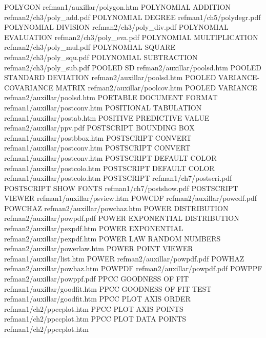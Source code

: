 POLYGON                                 refman1/auxillar/polygon.htm
POLYNOMIAL ADDITION                     refman2/ch3/poly_add.pdf
POLYNOMIAL DEGREE                       refman1/ch5/polydegr.pdf
POLYNOMIAL DIVISION                     refman2/ch3/poly_div.pdf
POLYNOMIAL EVALUATION                   refman2/ch3/poly_eva.pdf
POLYNOMIAL MULTIPLICATION               refman2/ch3/poly_mul.pdf
POLYNOMIAL SQUARE                       refman2/ch3/poly_squ.pdf
POLYNOMIAL SUBTRACTION                  refman2/ch3/poly_sub.pdf
POOLED SD                               refman2/auxillar/poolsd.htm
POOLED STANDARD DEVIATION               refman2/auxillar/poolsd.htm
POOLED VARIANCE-COVARIANCE MATRIX       refman2/auxillar/poolcov.htm
POOLED VARIANCE                         refman2/auxillar/poolsd.htm
PORTABLE DOCUMENT FORMAT                refman1/auxillar/postconv.htm
POSITIONAL TABULATION                   refman1/auxillar/postab.htm
POSITIVE PREDICTIVE VALUE               refman2/auxillar/ppv.pdf
POSTSCRIPT BOUNDING BOX                 refman1/auxillar/postbbox.htm
POSTSCRIPT CONVERT                      refman1/auxillar/postconv.htm
POSTSCRIPT CONVERT                      refman1/auxillar/postconv.htm
POSTSCRIPT DEFAULT COLOR                refman1/auxillar/postcolo.htm
POSTSCRIPT DEFAULT COLOR                refman1/auxillar/postcolo.htm
POSTSCRIPT                              refman1/ch7/postscri.pdf
POSTSCRIPT SHOW FONTS                   refman1/ch7/postshow.pdf
POSTSCRIPT VIEWER                       refman1/auxillar/psview.htm
POWCDF                                  refman2/auxillar/powcdf.pdf
POWCHAZ                                 refman2/auxillar/powchaz.htm
POWER DISTRIBUTION                      refman2/auxillar/powpdf.pdf
POWER EXPONENTIAL DISTRIBUTION          refman2/auxillar/pexpdf.htm
POWER EXPONENTIAL                       refman2/auxillar/pexpdf.htm
POWER LAW RANDOM NUMBERS                refman2/auxillar/powerlaw.htm
POWER POINT VIEWER                      refman1/auxillar/list.htm
POWER                                   refman2/auxillar/powpdf.pdf
POWHAZ                                  refman2/auxillar/powhaz.htm
POWPDF                                  refman2/auxillar/powpdf.pdf
POWPPF                                  refman2/auxillar/powppf.pdf
PPCC GOODNESS OF FIT                    refman1/auxillar/goodfit.htm
PPCC GOODNESS OF FIT TEST               refman1/auxillar/goodfit.htm
PPCC PLOT AXIS ORDER                    refman1/ch2/ppccplot.htm
PPCC PLOT AXIS POINTS                   refman1/ch2/ppccplot.htm
PPCC PLOT DATA POINTS                   refman1/ch2/ppccplot.htm
